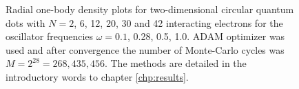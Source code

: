 \begin{landscape}
\begin{figure}[H]
		\caption{Radial one-body density plots for two-dimensional circular quantum dots with $N=2$, 6, 12, 20, 30 and 42 interacting electrons for the oscillator frequencies $\omega=0.1$, 0.28, 0.5, 1.0. ADAM optimizer was used and after convergence the number of Monte-Carlo cycles was $M=2^{28}=268,435,456$. The methods are detailed in the introductory words to chapter \ref{chp:results}.}
		\label{fig:OB_interaction_2D_2}
	\end{figure}
	\begin{figure} [H]%
		\centering
		\captionsetup[subfigure]{labelformat=empty}
		\captionsetup{width=0.9\hsize}
		\hspace{0.cm}
		\hspace{-0.0cm}
		\hspace{-0.0cm}
		\hspace{-0.0cm}
		\\ [-0.3cm]
		

\end{figure}
\end{landscape}
